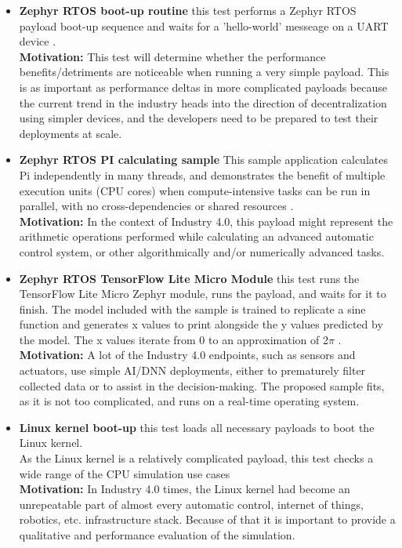 \begin{itemize}
    \item{\textbf{Zephyr RTOS boot-up routine} this test performs a Zephyr RTOS payload boot-up sequence and waits for
    a 'hello-world' messeage on a UART device \cite{ZephyrHello}.\\
    \textbf{Motivation:} This test will determine whether the performance benefits/detriments are noticeable when
    running a very simple payload. This is as important as performance deltas in more complicated payloads because
    the current trend in the industry heads into the direction of decentralization using simpler devices, and the
    developers need to be prepared to test their deployments at scale.}
    \item{\textbf{Zephyr RTOS PI calculating sample} This sample application calculates Pi independently in many
    threads, and demonstrates the benefit of multiple execution units (CPU cores) when compute-intensive tasks can be
    run in parallel, with no cross-dependencies or shared resources \cite{ZephyrPi}.\\
    \textbf{Motivation:} In the context of Industry 4.0, this payload might represent the arithmetic operations
    performed while calculating an advanced automatic control system, or other algorithmically and/or numerically
    advanced tasks.}
    \item{\textbf{Zephyr RTOS TensorFlow Lite Micro Module} this test runs the TensorFlow Lite Micro Zephyr module,
    runs the payload, and waits for it to finish. The model included with the sample is trained to replicate a sine
    function and generates x values to print alongside the y values predicted by the model. The x values iterate from 0
    to an approximation of 2$\pi$ \cite{ZephyrTF}.\\
    \textbf{Motivation:} A lot of the Industry 4.0 endpoints, such as sensors and actuators, use simple AI/DNN
    deployments, either to prematurely filter collected data or to assist in the decision-making. The proposed sample
    fits, as it is not too complicated, and runs on a real-time operating system.}
    \item{\textbf{Linux kernel boot-up} this test loads all necessary payloads to boot the Linux kernel.\\
    As the Linux kernel is a relatively complicated payload, this test checks a wide range of the CPU simulation use
    cases\\
    \textbf{Motivation:} In Industry 4.0 times, the Linux kernel had become an unrepeatable part of almost every
    automatic control, internet of things, robotics, etc. infrastructure stack. Because of that it is important to
    provide a qualitative and performance evaluation of the simulation.}
\end{itemize}

